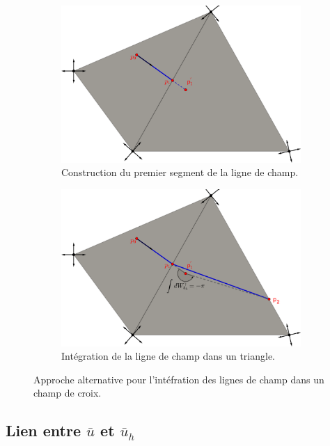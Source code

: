 \begin{figure}[!h]
     \centering
     \begin{subfigure}[b]{0.7\textwidth}
         \centering
         \includegraphics[width=\textwidth]{images/draw_streams_21.pdf}
         \caption{Construction du premier segment de la ligne de champ.}
     \end{subfigure}
     \begin{subfigure}[b]{0.7\textwidth}
         \centering
         \includegraphics[width=\textwidth]{images/draw_streams_22.pdf}
         \caption{Intégration de la ligne de champ dans un triangle.}
     \end{subfigure}
        \caption{Approche alternative pour l'intéfration des lignes de champ dans un champ de croix.}
        \label{fig:draw_streams_2}
\end{figure}


\subsection{Lien entre $\bar{u}$ et $\bar{u}_h$}

